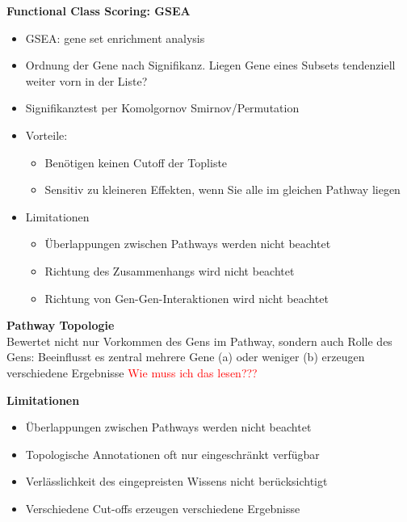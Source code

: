 \textbf{Functional Class Scoring: GSEA}
\begin{itemize}
	\item GSEA: gene set enrichment analysis
	\item Ordnung der Gene nach Signifikanz. Liegen Gene eines Subsets tendenziell weiter vorn in der Liste?
	\item Signifikanztest per Komolgornov Smirnov/Permutation
	\item Vorteile: 
	\begin{itemize}
		\item Benötigen keinen Cutoff der Topliste
		\item Sensitiv zu kleineren Effekten, wenn Sie alle im gleichen Pathway liegen
	\end{itemize}
	\item Limitationen
	\begin{itemize}
		\item Überlappungen zwischen Pathways werden nicht beachtet
		\item Richtung des Zusammenhangs wird nicht beachtet
		\item Richtung von Gen-Gen-Interaktionen wird nicht beachtet
	\end{itemize}
\end{itemize}

\textbf{Pathway Topologie}\\
Bewertet nicht nur Vorkommen des Gens im Pathway, sondern auch Rolle des Gens: Beeinflusst es zentral mehrere Gene (a) oder weniger (b) erzeugen verschiedene Ergebnisse \textcolor{red}{Wie muss ich das lesen???}

\textbf{Limitationen}
\begin{itemize}
	\item Überlappungen zwischen Pathways werden nicht beachtet
	\item Topologische Annotationen oft nur eingeschränkt verfügbar
	\item Verlässlichkeit des eingepreisten Wissens nicht berücksichtigt
	\item Verschiedene Cut-offs erzeugen verschiedene Ergebnisse
\end{itemize}